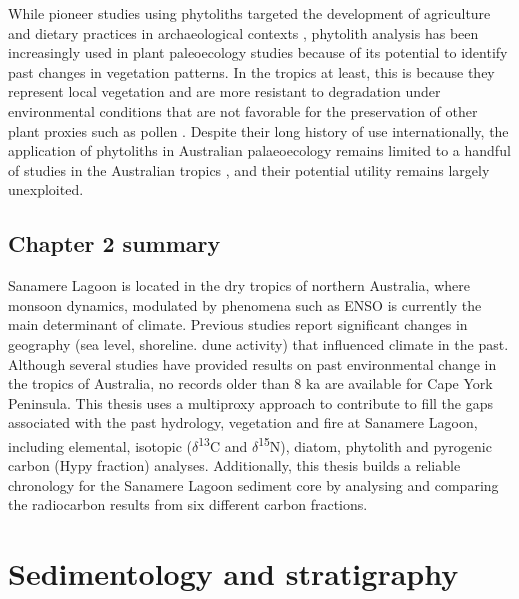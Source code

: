 \documentclass[
  12pt,
]{book}
\begin{document}
While pioneer studies using phytoliths targeted the development of agriculture and dietary practices in archaeological contexts \citep[e.g.~][]{pipernoPaleoecologicalPerspectivesHuman1991, kealhoferOpalPhytolithsSoutheast1998}, phytolith analysis has been increasingly used in plant paleoecology studies because of its potential to identify past changes in vegetation patterns. In the tropics at least, this is because they represent local vegetation and are more resistant to degradation under environmental conditions that are not favorable for the preservation of other plant proxies such as pollen \citep{rashidPhytolithsProxies2019, testePhytolithsNaachtunPeten2020}. Despite their long history of use internationally, the application of phytoliths in Australian palaeoecology remains limited to a handful of studies in the Australian tropics \citep{wallisOverviewLeafPhytolith2003, wallisEnvironmentalHistoryNorthwest2001}, and their potential utility remains largely unexploited.

\hypertarget{chapter-2-summary}{%
\section{Chapter 2 summary}\label{chapter-2-summary}}

Sanamere Lagoon is located in the dry tropics of northern Australia, where monsoon dynamics, modulated by phenomena such as ENSO is currently the main determinant of climate. Previous studies report significant changes in geography (sea level, shoreline. dune activity) that influenced climate in the past. Although several studies have provided results on past environmental change in the tropics of Australia, no records older than 8 ka are available for Cape York Peninsula. This thesis uses a multiproxy approach to contribute to fill the gaps associated with the past hydrology, vegetation and fire at Sanamere Lagoon, including elemental, isotopic (\(\delta\)\textsuperscript{13}C and \(\delta\)\textsuperscript{15}N), diatom, phytolith and pyrogenic carbon (Hypy fraction) analyses. Additionally, this thesis builds a reliable chronology for the Sanamere Lagoon sediment core by analysing and comparing the radiocarbon results from six different carbon fractions.

\hypertarget{sedimentology-and-stratigraphy}{%
\chapter{Sedimentology and stratigraphy}\label{sedimentology-and-stratigraphy}}
\end{document}
